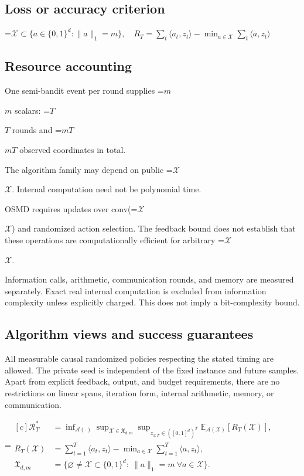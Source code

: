 \documentclass[10pt,a4paper]{article}
\newcommand{\AtlasMath}[1]{\par\begingroup\centering\setbox0=\hbox{$\displaystyle #1$}\ifdim\wd0>1.4\linewidth\typeout{ATLAS WIDE FORMULA: \the\wd0}\fi\ifdim\wd0>\linewidth\resizebox{\linewidth}{!}{\box0}\else\box0\fi\par\endgroup}
\newcommand{\AtlasInlineMath}[1]{\begingroup\setbox0=\hbox{$#1$}\ifdim\wd0>.4\linewidth\endgroup\AtlasMath{#1}\else\endgroup$#1$\fi}
\begin{document}
\subsection{Loss or accuracy criterion}

\AtlasMath{\mathcal{X}\subset\{a\in\{0,1\}^d:\|a\|_1=m\},\quad R_T=\sum_t\langle a_t,z_t\rangle-\min_{a\in\mathcal{X}}\sum_t\langle a,z_t\rangle}


\subsection{Resource accounting}
One semi-bandit event per round supplies \AtlasInlineMath{m} scalars: \AtlasInlineMath{T} rounds and \AtlasInlineMath{mT} observed coordinates in total.

The algorithm family may depend on public \AtlasInlineMath{\mathcal{X}}. Internal computation need not be polynomial time.

OSMD requires updates over conv(\AtlasInlineMath{\mathcal{X}}) and randomized action selection. The feedback bound does not establish that these operations are computationally efficient for arbitrary \AtlasInlineMath{\mathcal{X}}.

Information calls, arithmetic, communication rounds, and memory are measured separately. Exact real internal computation is excluded from information complexity unless explicitly charged. This does not imply a bit-complexity bound.

\subsection{Algorithm views and success guarantees}
All measurable causal randomized policies respecting the stated timing are allowed. The private seed is independent of the fixed instance and future samples. Apart from explicit feedback, output, and budget requirements, there are no restrictions on linear spans, iteration form, internal arithmetic, memory, or communication.


\AtlasMath{\begin{aligned}[c]\mathcal{R}_T^*&=\inf_{\mathcal{A}(\cdot)}\sup_{\mathcal{X}\in\mathfrak X_{d,m}}\sup_{z_{1:T}\in([0,1]^d)^T}\mathbb{E}_{\mathcal{A}(\mathcal{X})}[R_T(\mathcal{X})],\\ R_T(\mathcal{X})&=\sum_{t=1}^T\langle a_t,z_t\rangle-\min_{a\in\mathcal{X}}\sum_{t=1}^T\langle a,z_t\rangle,\\ \mathfrak X_{d,m}&=\{\varnothing\ne\mathcal{X}\subset\{0,1\}^d:\ \|a\|_1=m\ \forall a\in\mathcal{X}\}.\end{aligned}}
\end{document}

